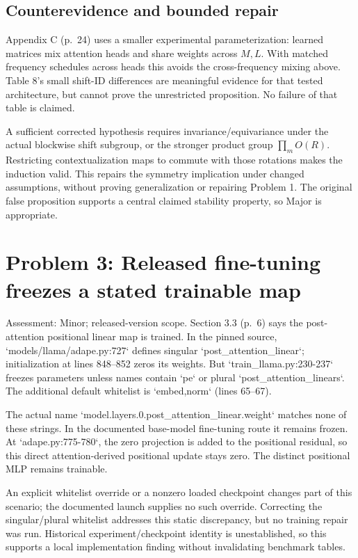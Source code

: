 \documentclass[10pt]{article}
\begin{document}
\subsection*{Counterevidence and bounded repair}
Appendix C (p. 24) uses a smaller experimental parameterization: learned matrices mix attention heads and share weights across \(M,L\). With matched frequency schedules across heads this avoids the cross-frequency mixing above. Table 8’s small shift-ID differences are meaningful evidence for that tested architecture, but cannot prove the unrestricted proposition. No failure of that table is claimed.\par
A sufficient corrected hypothesis requires invariance/equivariance under the actual blockwise shift subgroup, or the stronger product group \(\prod_m O(R)\). Restricting contextualization maps to commute with those rotations makes the induction valid. This repairs the symmetry implication under changed assumptions, without proving generalization or repairing Problem 1. The original false proposition supports a central claimed stability property, so Major is appropriate.\par
\section*{Problem 3: Released fine-tuning freezes a stated trainable map}
Assessment: Minor; released-version scope. Section 3.3 (p. 6) says the post-attention positional linear map is trained. In the pinned source, `models/llama/adape.py:727` defines singular `post\_attention\_linear`; initialization at lines 848–852 zeros its weights. But `train\_llama.py:230-237` freezes parameters unless names contain `pe` or plural `post\_attention\_linears`. The additional default whitelist is `embed,norm` (lines 65–67).\par
The actual name `model.layers.0.post\_attention\_linear.weight` matches none of these strings. In the documented base-model fine-tuning route it remains frozen. At `adape.py:775-780`, the zero projection is added to the positional residual, so this direct attention-derived positional update stays zero. The distinct positional MLP remains trainable.\par
An explicit whitelist override or a nonzero loaded checkpoint changes part of this scenario; the documented launch supplies no such override. Correcting the singular/plural whitelist addresses this static discrepancy, but no training repair was run. Historical experiment/checkpoint identity is unestablished, so this supports a local implementation finding without invalidating benchmark tables.\par
\end{document}
